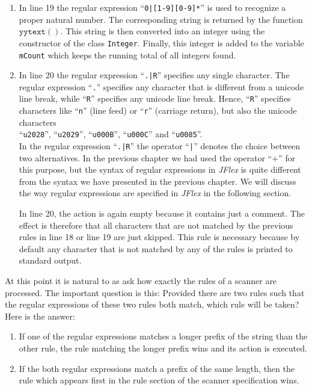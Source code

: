 \begin{enumerate}
\begin{enumerate}
      \item In line 19 the regular expression  ``\texttt{0|[1-9][0-9]*}'' is used to recognize a
            proper natural number.  The corresponding string is returned by the function
            $\texttt{yytext}()$.  This string is then converted into an integer using the
            constructor of the class \texttt{Integer}.  Finally, this integer is added to the
            variable \texttt{mCount} which keeps the running total of all integers found.
      \item In line 20 the regular expression  ``\texttt{.|R}'' specifies any single character.
            The regular expression ``\texttt{.}'' specifies any character that is different from a
            unicode line break, while ``\texttt{R}'' specifies any unicode line break.
            Hence,  ``\texttt{R}'' specifies characters like
            ``\texttt{n}'' (line feed) or ``\texttt{r}'' (carriage return),
            but also the unicode characters
            \\[0.2cm]
            \hspace*{1.3cm}
            ``\texttt{u2028}'',
            ``\texttt{u2029}'',
            ``\texttt{u000B}'',
            ``\texttt{u000C}'' and
            ``\texttt{u0085}''.
            \\[0.2cm]
            In the regular expression  ``\texttt{.|R}'' the operator ``\texttt{|}'' denotes the
            choice between two alternatives.  In the previous chapter we had used the  operator ``$+$''
            for this purpose, but the syntax of regular expressions in  \textsl{JFlex} is quite different
            from the syntax we have presented in the previous chapter.  We will discuss the way regular
            expressions are specified in \textsl{JFlex} in the following section.

            In line 20, the action is again empty because it contains just a comment.
            The effect is therefore that all characters that are not matched by the previous rules
            in line 18 or line 19 are just skipped.  This rule is necessary because by default any
            character that is not matched by any of the rules is printed to standard output.
      \end{enumerate}
\end{enumerate}
At this point it is natural to as ask how exactly the rules of a scanner are processed.  The
important question is this: Provided there are two rules such that the regular expressions of these
two rules both match, which rule will be taken?  Here is the answer:
\begin{enumerate}
\item If one of the regular expressions matches a longer prefix of the string than the other rule, the
      rule matching the longer prefix wins and its action is executed.
\item If the both regular expressions match a prefix of the same length, then the rule which appears
      first in the rule section of the scanner specification wins.
\end{enumerate}

